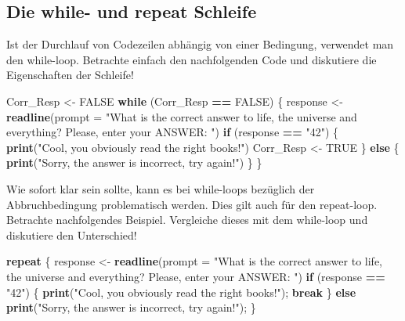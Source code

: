 \documentclass[]{article}
\newenvironment{Shaded}{\begin{snugshade}}{\end{snugshade}}
\newcommand{\KeywordTok}[1]{\textcolor[rgb]{0.13,0.29,0.53}{\textbf{#1}}}
\newcommand{\DataTypeTok}[1]{\textcolor[rgb]{0.13,0.29,0.53}{#1}}
\newcommand{\StringTok}[1]{\textcolor[rgb]{0.31,0.60,0.02}{#1}}
\newcommand{\OtherTok}[1]{\textcolor[rgb]{0.56,0.35,0.01}{#1}}
\newcommand{\ControlFlowTok}[1]{\textcolor[rgb]{0.13,0.29,0.53}{\textbf{#1}}}
\newcommand{\OperatorTok}[1]{\textcolor[rgb]{0.81,0.36,0.00}{\textbf{#1}}}
\newcommand{\NormalTok}[1]{#1}
\begin{document}
\subsection*{Die while- und repeat
Schleife}\label{die-while--und-repeat-schleife}

Ist der Durchlauf von Codezeilen abhängig von einer Bedingung, verwendet
man den while-loop. Betrachte einfach den nachfolgenden Code und
diskutiere die Eigenschaften der Schleife!

\begin{Shaded}
\begin{Highlighting}[]
\NormalTok{  Corr_Resp <-}\StringTok{ }\OtherTok{FALSE}
  \ControlFlowTok{while}\NormalTok{ (Corr_Resp }\OperatorTok{==}\StringTok{ }\OtherTok{FALSE}\NormalTok{) \{}
\NormalTok{    response <-}\StringTok{ }\KeywordTok{readline}\NormalTok{(}\DataTypeTok{prompt =} \StringTok{"What is the correct answer to life, the universe and everything? Please, enter your ANSWER: "}\NormalTok{)}
    \ControlFlowTok{if}\NormalTok{ (response }\OperatorTok{==}\StringTok{ "42"}\NormalTok{) \{}
      \KeywordTok{print}\NormalTok{(}\StringTok{"Cool, you obviously read the right books!"}\NormalTok{)}
\NormalTok{      Corr_Resp <-}\StringTok{ }\OtherTok{TRUE}
\NormalTok{    \} }\ControlFlowTok{else}\NormalTok{ \{}
      \KeywordTok{print}\NormalTok{(}\StringTok{"Sorry, the answer is incorrect, try again!"}\NormalTok{)}
\NormalTok{      \}}
\NormalTok{  \}}
\end{Highlighting}
\end{Shaded}

Wie sofort klar sein sollte, kann es bei while-loops bezüglich der
Abbruchbedingung problematisch werden. Dies gilt auch für den
repeat-loop. Betrachte nachfolgendes Beispiel. Vergleiche dieses mit dem
while-loop und diskutiere den Unterschied!

\begin{Shaded}
\begin{Highlighting}[]
  \ControlFlowTok{repeat}\NormalTok{ \{   }
\NormalTok{    response <-}\StringTok{ }\KeywordTok{readline}\NormalTok{(}\DataTypeTok{prompt =} \StringTok{"What is the correct answer to life, the universe and everything? Please, enter your ANSWER: "}\NormalTok{)}
    \ControlFlowTok{if}\NormalTok{ (response }\OperatorTok{==}\StringTok{ "42"}\NormalTok{) \{}
      \KeywordTok{print}\NormalTok{(}\StringTok{"Cool, you obviously read the right books!"}\NormalTok{);}
      \ControlFlowTok{break}
\NormalTok{    \} }\ControlFlowTok{else} \KeywordTok{print}\NormalTok{(}\StringTok{"Sorry, the answer is incorrect, try again!"}\NormalTok{);}
\NormalTok{  \}}
\end{Highlighting}
\end{Shaded}
\end{document}
